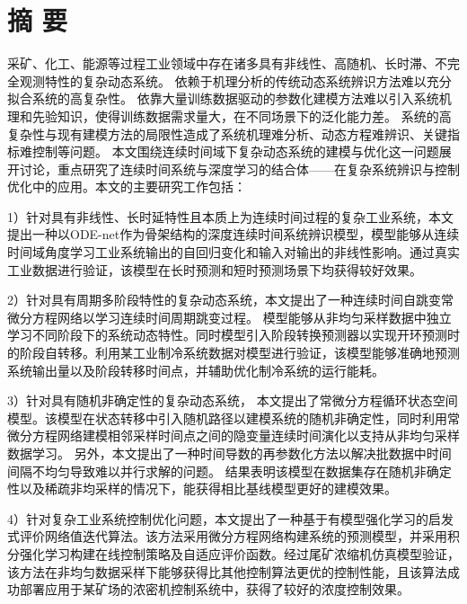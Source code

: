 
\chapter*{ 摘 \space 要 }

采矿、化工、能源等过程工业领域中存在诸多具有非线性、高随机、长时滞、不完全观测特性的复杂动态系统。
依赖于机理分析的传统动态系统辨识方法难以充分拟合系统的高复杂性。
依靠大量训练数据驱动的参数化建模方法难以引入系统机理和先验知识，使得训练数据需求量大，在不同场景下的泛化能力差。
系统的高复杂性与现有建模方法的局限性造成了系统机理难分析、动态方程难辨识、关键指标难控制等问题。
本文围绕连续时间域下复杂动态系统的建模与优化这一问题展开讨论，重点研究了连续时间系统与深度学习的结合体——在复杂系统辨识与控制优化中的应用。本文的主要研究工作包括：

1）针对具有非线性、长时延特性且本质上为连续时间过程的复杂工业系统，本文提出一种以ODE-net作为骨架结构的深度连续时间系统辨识模型，模型能够从连续时间域角度学习工业系统输出的自回归变化和输入对输出的非线性影响。通过真实工业数据进行验证，该模型在长时预测和短时预测场景下均获得较好效果。   

2）针对具有周期多阶段特性的复杂动态系统，本文提出了一种连续时间自跳变常微分方程网络以学习连续时间周期跳变过程。
模型能够从非均匀采样数据中独立学习不同阶段下的系统动态特性。同时模型引入阶段转换预测器以实现开环预测时的阶段自转移。利用某工业制冷系统数据对模型进行验证，该模型能够准确地预测系统输出量以及阶段转移时间点，并辅助优化制冷系统的运行能耗。

3）针对具有随机非确定性的复杂动态系统，
本文提出了常微分方程循环状态空间模型。该模型在状态转移中引入随机路径以建模系统的随机非确定性，同时利用常微分方程网络建模相邻采样时间点之间的隐变量连续时间演化以支持从非均匀采样数据学习。
另外，本文提出了一种时间导数的再参数化方法以解决批数据中时间间隔不均匀导致难以并行求解的问题。
结果表明该模型在数据集存在随机非确定性以及稀疏非均采样的情况下，能获得相比基线模型更好的建模效果。

4）针对复杂工业系统控制优化问题，本文提出了一种基于有模型强化学习的启发式评价网络值迭代算法。该方法采用微分方程网络构建系统的预测模型，并采用积分强化学习构建在线控制策略及自适应评价函数。经过尾矿浓缩机仿真模型验证，该方法在非均匀数据采样下能够获得比其他控制算法更优的控制性能，且该算法成功部署应用于某矿场的浓密机控制系统中，获得了较好的浓度控制效果。

